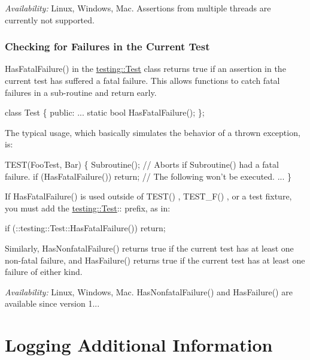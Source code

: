 {\itshape Availability\+:} Linux, Windows, Mac. Assertions from multiple threads are currently not supported.

\subsubsection*{Checking for Failures in the Current Test}

{\ttfamily Has\+Fatal\+Failure()} in the {\ttfamily \hyperlink{classtesting_1_1Test}{testing\+::\+Test}} class returns {\ttfamily true} if an assertion in the current test has suffered a fatal failure. This allows functions to catch fatal failures in a sub-\/routine and return early.


\begin{DoxyCode}
class Test \{
 public:
  ...
  static bool HasFatalFailure();
\};
\end{DoxyCode}


The typical usage, which basically simulates the behavior of a thrown exception, is\+:


\begin{DoxyCode}
TEST(FooTest, Bar) \{
  Subroutine();
  // Aborts if Subroutine() had a fatal failure.
  if (HasFatalFailure())
    return;
  // The following won't be executed.
  ...
\}
\end{DoxyCode}


If {\ttfamily Has\+Fatal\+Failure()} is used outside of {\ttfamily T\+E\+S\+T()} , {\ttfamily T\+E\+S\+T\+\_\+\+F()} , or a test fixture, you must add the {\ttfamily \hyperlink{classtesting_1_1Test}{testing\+::\+Test}\+:\+:} prefix, as in\+:


\begin{DoxyCode}
if (::testing::Test::HasFatalFailure())
  return;
\end{DoxyCode}


Similarly, {\ttfamily Has\+Nonfatal\+Failure()} returns {\ttfamily true} if the current test has at least one non-\/fatal failure, and {\ttfamily Has\+Failure()} returns {\ttfamily true} if the current test has at least one failure of either kind.

{\itshape Availability\+:} Linux, Windows, Mac. {\ttfamily Has\+Nonfatal\+Failure()} and {\ttfamily Has\+Failure()} are available since version 1...

\section*{Logging Additional Information}

